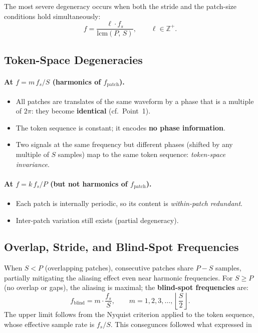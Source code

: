 The most severe degeneracy occurs when both the stride and the patch-size conditions hold
simultaneously:
\begin{equation}
    f = \frac{\ell \cdot f_s}{\mathrm{lcm}(P,\, S)},
    \qquad \ell \in \mathbb{Z}^+.
\end{equation}

\subsection{Token-Space Degeneracies}

\paragraph{At $f = m\,f_s/S$ (harmonics of $f_{\mathrm{patch}}$).}
\begin{itemize}
    \item All patches are translates of the same waveform by a phase that is a multiple of
          $2\pi$: they become \textbf{identical} (cf.\ Point~1).
    \item The token sequence is constant; it encodes \textbf{no phase information}.
    \item Two signals at the same frequency but different phases (shifted by any multiple of
          $S$ samples) map to the same token sequence: \emph{token-space invariance}.
\end{itemize}

\paragraph{At $f = k\,f_s/P$ (but not harmonics of $f_{\mathrm{patch}}$).}
\begin{itemize}
    \item Each patch is internally periodic, so its content is \emph{within-patch redundant}.
    \item Inter-patch variation still exists (partial degeneracy).
\end{itemize}

\subsection{Overlap, Stride, and Blind-Spot Frequencies}

When $S < P$ (overlapping patches), consecutive patches share $P - S$ samples, partially
mitigating the aliasing effect even near harmonic frequencies.  For $S \geq P$ (no overlap
or gaps), the aliasing is maximal; the \textbf{blind-spot frequencies} are:
\begin{equation}
    \boxed{f_{\mathrm{blind}} = m \cdot \frac{f_s}{S},
    \qquad m = 1, 2, 3, \ldots, \left\lfloor \frac{S}{2} \right\rfloor.}
\end{equation}
The upper limit follows from the Nyquist criterion applied to the token sequence, whose
effective sample rate is $f_s/S$. This consegunces followed what expressed in \cite{paganiPreliminaryInsightsChronos2026b}

